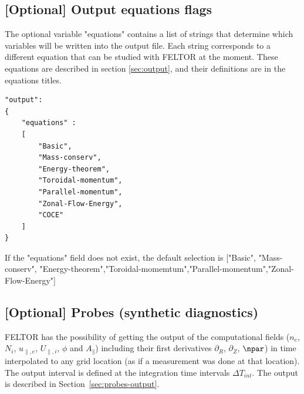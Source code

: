 \subsection{[Optional] Output equations flags}\label{sec:output_flags}
The optional variable "equations" contains a list of strings that
determine which variables will be written into the output file.
Each string
corresponds to a different equation that can be studied with FELTOR at the
moment. These equations are described in section \ref{sec:output}, and their
definitions are in the equations titles.
\begin{verbatim}
"output":
{
    "equations" :
    [
        "Basic",
        "Mass-conserv",
        "Energy-theorem",
        "Toroidal-momentum",
        "Parallel-momentum",
        "Zonal-Flow-Energy",
        "COCE"
    ]
}
\end{verbatim}
\begin{tcolorbox}[title=Note]
    If the "equations" field does not exist, the default selection is ["Basic", "Mass-conserv", "Energy-theorem","Toroidal-momemtum","Parallel-momentum","Zonal-Flow-Energy"]
\end{tcolorbox}

\subsection{[Optional] Probes (synthetic diagnostics)}
FELTOR has the possibility of getting the output of the computational fields
($n_e$, $N_i$, $u_{\parallel,e}$, $U_{\parallel,i}$, $\phi$ and $A_\parallel$)
including their first derivatives $\partial_R$, $\partial_Z$, $\npar$) in time
interpolated to any grid location (as if a measurement was done at that
location). The output interval is defined at the integration time intervals
$\Delta T_{int}$. The output is described in Section~\ref{sec:probes-output}.

